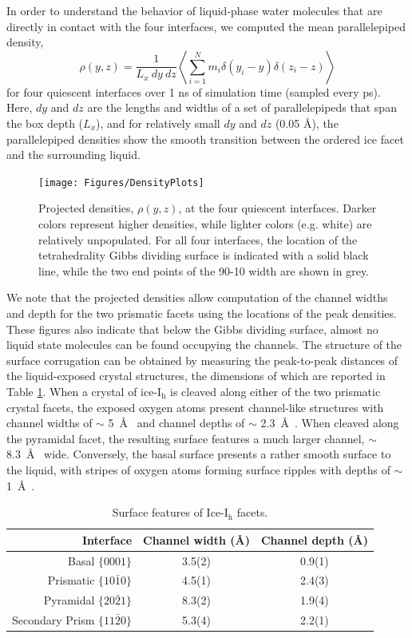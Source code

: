 In order to understand the behavior of liquid-phase water molecules
that are directly in contact with the four interfaces, we computed the
mean parallelepiped density,
\begin{equation}
\rho(y, z) = \frac{1}{L_x~dy~dz} \left< \sum_{i = 1}^{N} m_i \delta(y_i - y) \delta(z_i - z)\right>
\end{equation}
for four quiescent interfaces over 1 ns of simulation time (sampled
every ps).  Here, $dy$ and $dz$ are the lengths and widths of a set of
parallelepipeds that span the box depth ($L_x$), and for relatively
small $dy$ and $dz$ (0.05 \AA), the parallelepiped densities show the
smooth transition between the ordered ice facet and the surrounding
liquid.

\begin{figure}
\texttt{[image: Figures/DensityPlots]}
\caption{\label{fig:DensPlots} Projected densities, $\rho(y, z)$, at
  the four quiescent interfaces.  Darker colors represent higher
  densities, while lighter colors (e.g. white) are relatively
  unpopulated.  For all four interfaces, the location of the
  tetrahedrality Gibbs dividing surface is indicated with a solid
  black line, while the two end points of the 90-10 width are shown in
  grey.}
\end{figure}

We note that the projected densities allow computation of the channel
widths and depth for the two prismatic facets using the locations of
the peak densities.  These figures also indicate that below the Gibbs
dividing surface, almost no liquid state molecules can be found
occupying the channels.  The structure of the surface corrugation can
be obtained by measuring the peak-to-peak distances of the
liquid-exposed crystal structures, the dimensions of which are
reported in Table \ref{tab:surf}. When a crystal of ice-I$_\mathrm{h}$
is cleaved along either of the two prismatic crystal facets, the
exposed oxygen atoms present channel-like structures with channel
widths of $\sim$ 5~\AA~ and channel depths of $\sim$ 2.3~\AA~.  When
cleaved along the pyramidal facet, the resulting surface features a
much larger channel, $\sim$ 8.3~\AA~ wide.  Conversely, the basal
surface presents a rather smooth surface to the liquid, with stripes
of oxygen atoms forming surface ripples with depths of $\sim$ 1~\AA~.

\begin{table}[h]
\centering
\caption{Surface features of Ice-I$_\mathrm{h}$ facets.\label{tab:surf}}
\begin{tabular}{r|cc}  
\toprule
Interface & Channel width (\AA) & Channel depth (\AA) \\ 
\midrule
Basal  $\{0001\}$                 & 3.5(2) & 0.9(1)  \\
Prismatic  $\{10\bar{1}0\}$       & 4.5(1) & 2.4(3)  \\
Pyramidal  $\{20\bar{2}1\}$       & 8.3(2) & 1.9(4)  \\
Secondary Prism  $\{11\bar{2}0\}$ & 5.3(4) & 2.2(1)  \\ 
\bottomrule
\end{tabular}
\end{table}

